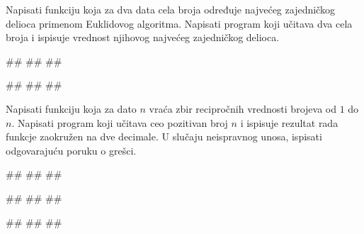 \begin{Exercise}[label=FUN_05] 
Napisati funkciju  koja za dva data
cela broja određuje najvećeg zajedničkog delioca primenom Euklidovog
algoritma. Napisati program koji učitava dva cela broja i ispisuje
vrednost njihovog najvećeg zajedničkog delioca.

\begin{miditest}
\begin{upotreba}{1}
#\naslovInt#
##
##
\end{upotreba}
\end{miditest}
\begin{miditest}
\begin{upotreba}{2}
#\naslovInt#
##
##
\end{upotreba}
\end{miditest}

\end{Exercise}
\ifresenja 
\begin{Answer}[ref=FUN_05]
\end{Answer} 
\fi


\begin{Exercise}[label=FUN_06] 
Napisati funkciju  koja za dato
$n$ vraća zbir recipročnih vrednosti brojeva od $1$ do $n$. Napisati
program koji učitava ceo pozitivan broj $n$ i ispisuje rezultat rada funkcje
zaokružen na dve decimale. 
U slučaju neispravnog unosa, ispisati odgovarajuću poruku o grešci.

\begin{miditest}
\begin{upotreba}{1}
#\naslovInt#
##
##
\end{upotreba}
\end{miditest}
\begin{miditest}
\begin{upotreba}{2}
#\naslovInt#
##
##
\end{upotreba}
\end{miditest}

\begin{miditest}
\begin{upotreba}{3}
#\naslovInt#
##
##
\end{upotreba}
\end{miditest}

\end{Exercise}
\ifresenja 
\begin{Answer}[ref=FUN_06]
\end{Answer} 
\fi


